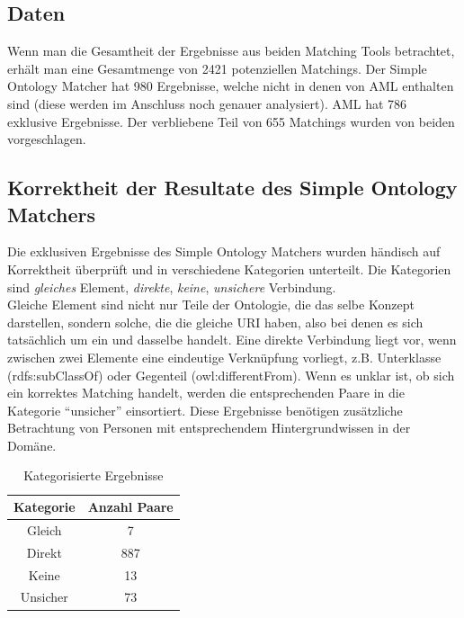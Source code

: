 		\subsection{Daten}
		Wenn man die Gesamtheit der Ergebnisse aus beiden Matching Tools betrachtet,
		erhält man eine Gesamtmenge von 2421 potenziellen Matchings. Der Simple
		Ontology Matcher hat 980 Ergebnisse, welche nicht in denen von AML enthalten
		sind (diese werden im Anschluss noch genauer analysiert). AML hat 786
		exklusive Ergebnisse. Der verbliebene Teil von 655 Matchings wurden von beiden
		vorgeschlagen.
		
		\subsection{Korrektheit der Resultate des Simple Ontology Matchers}
		Die exklusiven Ergebnisse des Simple Ontology Matchers wurden händisch auf
		Korrektheit überprüft und in verschiedene Kategorien unterteilt. Die
		Kategorien sind \textit{gleiches} Element, \textit{direkte}, \textit{keine}, \textit{unsichere}
		Verbindung.\\
		Gleiche Element sind nicht nur Teile der Ontologie, die das
		selbe Konzept darstellen, sondern solche, die die gleiche URI haben, also bei denen
		es sich tatsächlich um ein und dasselbe handelt. Eine direkte Verbindung liegt
		vor, wenn zwischen zwei Elemente eine eindeutige Verknüpfung vorliegt, z.B.
		Unterklasse (rdfs:subClassOf) oder Gegenteil (owl:differentFrom). Wenn
		es unklar ist, ob sich ein korrektes Matching handelt, werden die entsprechenden Paare in die
		Kategorie "`unsicher"' einsortiert. Diese Ergebnisse benötigen zusätzliche
		Betrachtung von Personen mit entsprechendem Hintergrundwissen in der Domäne.\\
		
		\begin{table}
		\centering
		\caption{Kategorisierte Ergebnisse}
		\begin{tabular}{|c|c|}\hline
		Kategorie & Anzahl Paare\\ \hline
		Gleich & 7\\ \hline
		Direkt & 887\\ \hline
		Keine & 13\\ \hline
		Unsicher & 73\\ \hline
		\end{tabular}
		\end{table}
		
